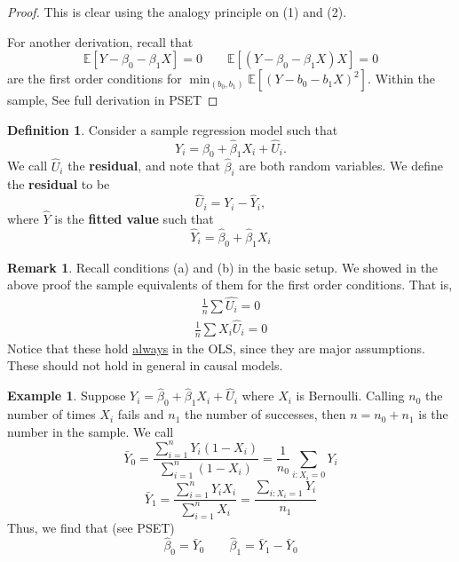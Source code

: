 \documentclass[10pt, oneside]{article}
\newcommand{\bbE}{\mathbb{E}}
\theoremstyle{definition}
\newtheorem{exmp}{Example}[section]
\newtheorem{defn}{Definition}
\newtheorem{rem}{Remark}
\begin{document}
\begin{proof}
This is clear using the analogy principle on (1) and (2). 

    For another derivation, recall that 
    \[\bbE[Y - \beta_0 - \beta_1 X] = 0 \qquad \bbE[(Y - \beta_0 - \beta_1 X)X]= 0\] are the first order conditions for $\min_{(b_0, b_1)} \bbE[(Y - b_0 - b_1 X)^2].$ Within the sample, See full derivation in PSET
\end{proof}


\begin{defn}
    Consider a sample regression model such that 
    \[Y_i = \hat{\beta}_0 + \hat{\beta}_1 X_i + \hat{U}_i.\] We call $\hat{U}_i$ the \textbf{residual}, and note that $\hat{\beta}_i$ are both random variables. We define the \textbf{residual} to be 
    \[\hat{U}_i = Y_i - \hat{Y}_i,\] where $\hat{Y}$ is the \textbf{fitted value} such that 
    \[\hat{Y}_i = \hat{\beta}_0 + \hat{\beta}_1 X_i\]
\end{defn}


\begin{rem}
    Recall conditions (a) and (b) in the basic setup. We showed in the above proof the sample equivalents of them for the first order conditions. That is, 
    \begin{align}
    \boxed{\frac{1}{n}\sum \hat{U_i} = 0 }
    \end{align}
    \begin{align}
    \boxed{\frac{1}{n}\sum X_i\hat U_i = 0}
    \end{align}
    Notice that these hold \underline{always} in the OLS, since they are major assumptions. These should not hold in general in causal models.
\end{rem}


\begin{exmp}
    Suppose $Y_i = \hat{\beta}_0 + \hat{\beta}_1 X_i + \hat{U}_i$ where $X_i$ is Bernoulli. Calling $n_0$ the number of times $X_i$ fails and $n_1$ the number of successes, then $n = n_0 + n_1$ is the number in the sample. We call 
    \[\bar Y_0 = \frac{\sum_{i=1}^n Y_i(1 - X_i)}{\sum_{i=1}^n (1 - X_i)} = \frac{1}{n_0} \sum_{i:X_i = 0} Y_i\]
    \[\bar Y_1 = \frac{\sum_{i=1}^n Y_i X_i}{\sum_{i=1}^n X_i} = \frac{\sum_{i : X_i = 1}Y_i}{n_1}\] Thus, we find that (see PSET)
    \[\hat{\beta}_0 = \bar Y_0 \qquad \hat{\beta}_1 = \bar Y_1 - \bar Y_0\]
\end{exmp}
\end{document}
